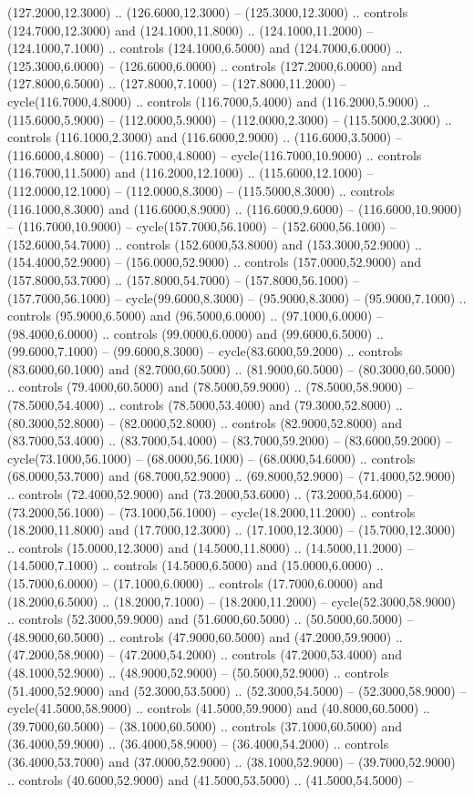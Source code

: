 (127.2000,12.3000) .. (126.6000,12.3000) -- (125.3000,12.3000) .. controls (124.7000,12.3000) and (124.1000,11.8000) .. (124.1000,11.2000) -- (124.1000,7.1000) .. controls (124.1000,6.5000) and (124.7000,6.0000) .. (125.3000,6.0000) -- (126.6000,6.0000) .. controls (127.2000,6.0000) and (127.8000,6.5000) .. (127.8000,7.1000) -- (127.8000,11.2000) -- cycle(116.7000,4.8000) .. controls (116.7000,5.4000) and (116.2000,5.9000) .. (115.6000,5.9000) -- (112.0000,5.9000) -- (112.0000,2.3000) -- (115.5000,2.3000) .. controls (116.1000,2.3000) and (116.6000,2.9000) .. (116.6000,3.5000) -- (116.6000,4.8000) -- (116.7000,4.8000) -- cycle(116.7000,10.9000) .. controls (116.7000,11.5000) and (116.2000,12.1000) .. (115.6000,12.1000) -- (112.0000,12.1000) -- (112.0000,8.3000) -- (115.5000,8.3000) .. controls (116.1000,8.3000) and (116.6000,8.9000) .. (116.6000,9.6000) -- (116.6000,10.9000) -- (116.7000,10.9000) -- cycle(157.7000,56.1000) -- (152.6000,56.1000) -- (152.6000,54.7000) .. controls (152.6000,53.8000) and (153.3000,52.9000) .. (154.4000,52.9000) -- (156.0000,52.9000) .. controls (157.0000,52.9000) and (157.8000,53.7000) .. (157.8000,54.7000) -- (157.8000,56.1000) -- (157.7000,56.1000) -- cycle(99.6000,8.3000) -- (95.9000,8.3000) -- (95.9000,7.1000) .. controls (95.9000,6.5000) and (96.5000,6.0000) .. (97.1000,6.0000) -- (98.4000,6.0000) .. controls (99.0000,6.0000) and (99.6000,6.5000) .. (99.6000,7.1000) -- (99.6000,8.3000) -- cycle(83.6000,59.2000) .. controls (83.6000,60.1000) and (82.7000,60.5000) .. (81.9000,60.5000) -- (80.3000,60.5000) .. controls (79.4000,60.5000) and (78.5000,59.9000) .. (78.5000,58.9000) -- (78.5000,54.4000) .. controls (78.5000,53.4000) and (79.3000,52.8000) .. (80.3000,52.8000) -- (82.0000,52.8000) .. controls (82.9000,52.8000) and (83.7000,53.4000) .. (83.7000,54.4000) -- (83.7000,59.2000) -- (83.6000,59.2000) -- cycle(73.1000,56.1000) -- (68.0000,56.1000) -- (68.0000,54.6000) .. controls (68.0000,53.7000) and (68.7000,52.9000) .. (69.8000,52.9000) -- (71.4000,52.9000) .. controls (72.4000,52.9000) and (73.2000,53.6000) .. (73.2000,54.6000) -- (73.2000,56.1000) -- (73.1000,56.1000) -- cycle(18.2000,11.2000) .. controls (18.2000,11.8000) and (17.7000,12.3000) .. (17.1000,12.3000) -- (15.7000,12.3000) .. controls (15.0000,12.3000) and (14.5000,11.8000) .. (14.5000,11.2000) -- (14.5000,7.1000) .. controls (14.5000,6.5000) and (15.0000,6.0000) .. (15.7000,6.0000) -- (17.1000,6.0000) .. controls (17.7000,6.0000) and (18.2000,6.5000) .. (18.2000,7.1000) -- (18.2000,11.2000) -- cycle(52.3000,58.9000) .. controls (52.3000,59.9000) and (51.6000,60.5000) .. (50.5000,60.5000) -- (48.9000,60.5000) .. controls (47.9000,60.5000) and (47.2000,59.9000) .. (47.2000,58.9000) -- (47.2000,54.2000) .. controls (47.2000,53.4000) and (48.1000,52.9000) .. (48.9000,52.9000) -- (50.5000,52.9000) .. controls (51.4000,52.9000) and (52.3000,53.5000) .. (52.3000,54.5000) -- (52.3000,58.9000) -- cycle(41.5000,58.9000) .. controls (41.5000,59.9000) and (40.8000,60.5000) .. (39.7000,60.5000) -- (38.1000,60.5000) .. controls (37.1000,60.5000) and (36.4000,59.9000) .. (36.4000,58.9000) -- (36.4000,54.2000) .. controls (36.4000,53.7000) and (37.0000,52.9000) .. (38.1000,52.9000) -- (39.7000,52.9000) .. controls (40.6000,52.9000) and (41.5000,53.5000) .. (41.5000,54.5000) -- 